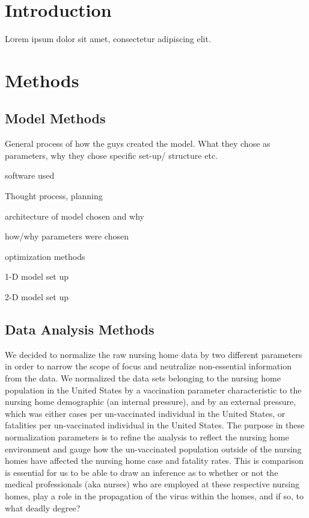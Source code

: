 \documentclass[twoside]{article}
\begin{document}
\begin{multicols}{2} %

\section{Introduction}

\lettrine[nindent=0em,lines=3]{L} orem ipsum dolor sit amet, consectetur adipiscing elit.
\lipsum[2-3] %


\section{Methods}

\subsection{Model Methods}
General process of how the guys created the model. What they chose as parameters, why they chose specific set-up/ structure etc. 
\begin{compactitem}
\item software used
\item Thought process, planning
\item architecture of model chosen and why 
\item how/why parameters were chosen 
\item optimization methods
\item 1-D model set up
\item 2-D model set up
\end{compactitem}

\subsection{Data Analysis Methods}



We decided to normalize the raw nursing home data by two different parameters in order to narrow the scope of focus and neutralize non-essential information from the data. We normalized the data sets belonging to the nursing home population in the United States by a vaccination parameter characteristic to the nursing home demographic (an internal pressure), and by an external pressure, which was either cases per un-vaccinated individual in the United States, or fatalities per un-vaccinated individual in the United States. The purpose in these normalization parameters is to refine the analysis to reflect the nursing home environment and gauge how the un-vaccinated population outside of the nursing homes have affected the nursing home case and fatality rates. This is comparison is essential for us to be able to draw an inference as to whether or not the medical professionals (aka nurses) who are employed at these respective nursing homes, play a role in the propagation of the virus within the homes, and if so, to what deadly degree?



\end{multicols}
\end{document}
